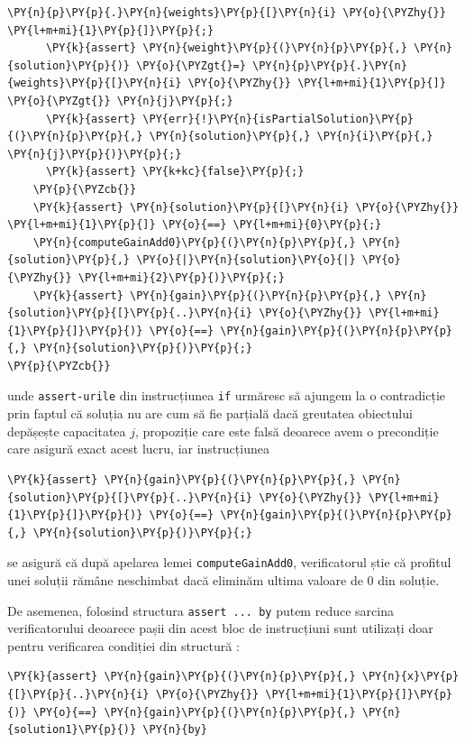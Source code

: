 \begin{sloppypar}
\begin{itemize}
\begin{Verbatim}[commandchars=\\\{\}]
        \PY{n}{p}\PY{p}{.}\PY{n}{weights}\PY{p}{[}\PY{n}{i} \PY{o}{\PYZhy{}} \PY{l+m+mi}{1}\PY{p}{]}\PY{p}{;}
      \PY{k}{assert} \PY{n}{weight}\PY{p}{(}\PY{n}{p}\PY{p}{,} \PY{n}{solution}\PY{p}{)} \PY{o}{\PYZgt{}=} \PY{n}{p}\PY{p}{.}\PY{n}{weights}\PY{p}{[}\PY{n}{i} \PY{o}{\PYZhy{}} \PY{l+m+mi}{1}\PY{p}{]} \PY{o}{\PYZgt{}} \PY{n}{j}\PY{p}{;}
      \PY{k}{assert} \PY{err}{!}\PY{n}{isPartialSolution}\PY{p}{(}\PY{n}{p}\PY{p}{,} \PY{n}{solution}\PY{p}{,} \PY{n}{i}\PY{p}{,} \PY{n}{j}\PY{p}{)}\PY{p}{;}
      \PY{k}{assert} \PY{k+kc}{false}\PY{p}{;}
    \PY{p}{\PYZcb{}}
    \PY{k}{assert} \PY{n}{solution}\PY{p}{[}\PY{n}{i} \PY{o}{\PYZhy{}} \PY{l+m+mi}{1}\PY{p}{]} \PY{o}{==} \PY{l+m+mi}{0}\PY{p}{;}
    \PY{n}{computeGainAdd0}\PY{p}{(}\PY{n}{p}\PY{p}{,} \PY{n}{solution}\PY{p}{,} \PY{o}{|}\PY{n}{solution}\PY{o}{|} \PY{o}{\PYZhy{}} \PY{l+m+mi}{2}\PY{p}{)}\PY{p}{;}
    \PY{k}{assert} \PY{n}{gain}\PY{p}{(}\PY{n}{p}\PY{p}{,} \PY{n}{solution}\PY{p}{[}\PY{p}{..}\PY{n}{i} \PY{o}{\PYZhy{}} \PY{l+m+mi}{1}\PY{p}{]}\PY{p}{)} \PY{o}{==} \PY{n}{gain}\PY{p}{(}\PY{n}{p}\PY{p}{,} \PY{n}{solution}\PY{p}{)}\PY{p}{;}
\PY{p}{\PYZcb{}}
\end{Verbatim}
    unde \texttt{assert-urile} din instrucțiunea \texttt{if} urmăresc să ajungem la o contradicție prin faptul că soluția nu are cum să fie parțială dacă greutatea obiectului depășește capacitatea $j$, propoziție care este falsă deoarece avem o precondiție care asigură exact acest lucru, iar instrucțiunea 
    \begin{Verbatim}[commandchars=\\\{\}]
\PY{k}{assert} \PY{n}{gain}\PY{p}{(}\PY{n}{p}\PY{p}{,} \PY{n}{solution}\PY{p}{[}\PY{p}{..}\PY{n}{i} \PY{o}{\PYZhy{}} \PY{l+m+mi}{1}\PY{p}{]}\PY{p}{)} \PY{o}{==} \PY{n}{gain}\PY{p}{(}\PY{n}{p}\PY{p}{,} \PY{n}{solution}\PY{p}{)}\PY{p}{;}
\end{Verbatim}
    se asigură că după apelarea lemei \texttt{computeGainAdd0}, verificatorul știe că profitul unei soluții rămâne neschimbat dacă eliminăm ultima valoare de 0 din soluție. \par
    \hspace{3mm} De asemenea, folosind structura \texttt{assert ... by} putem reduce sarcina verificatorului deoarece pașii din acest bloc de instrucțiuni sunt utilizați doar pentru verificarea condiției din structură \cite{verification_optimization}:
    \begin{Verbatim}[commandchars=\\\{\}]
\PY{k}{assert} \PY{n}{gain}\PY{p}{(}\PY{n}{p}\PY{p}{,} \PY{n}{x}\PY{p}{[}\PY{p}{..}\PY{n}{i} \PY{o}{\PYZhy{}} \PY{l+m+mi}{1}\PY{p}{]}\PY{p}{)} \PY{o}{==} \PY{n}{gain}\PY{p}{(}\PY{n}{p}\PY{p}{,} \PY{n}{solution1}\PY{p}{)} \PY{n}{by}

\end{Verbatim}
\end{itemize}
\end{sloppypar}
